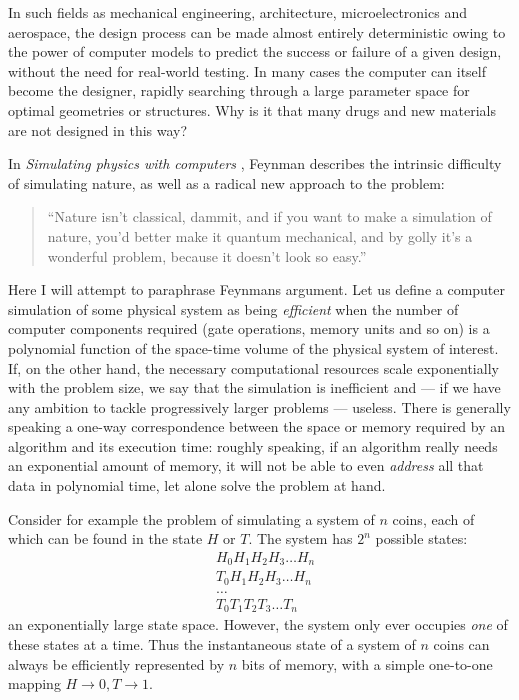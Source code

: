 In such fields as mechanical engineering, architecture, microelectronics and aerospace,  the design process can be made almost entirely deterministic owing to the power of computer models to predict the success or failure of a given design, without the need for real-world testing. In many cases the computer can itself become the designer, rapidly searching through a large parameter space for optimal geometries or structures.  Why is it that many drugs and new materials are not designed in this way?

In \emph{Simulating physics with computers} \cite{Feynman1982d}, Feynman describes the intrinsic difficulty of simulating nature, as well as a radical new approach to the problem:
\begin{quote}
``Nature isn't classical, dammit, and if you want to make a simulation of nature, you'd better make it quantum mechanical, and by golly it's a wonderful problem, because it doesn't look so easy.''
\end{quote}
Here I will attempt to paraphrase Feynmans argument. Let us define a computer simulation of some physical system as being \emph{efficient} when the number of computer components required (gate operations, memory units and so on) is a polynomial function of the space-time volume of the physical system of interest. If, on the other hand, the necessary computational resources scale exponentially with the problem size, we say that the simulation is inefficient and --- if we have any ambition to tackle progressively larger problems ---  useless. There is generally speaking a one-way correspondence between the space or memory required by an algorithm and its execution time: roughly speaking, if an algorithm really needs an exponential amount of memory, it will not be able to even \emph{address} all that data in polynomial time, let alone solve the problem at hand. 

Consider for example the problem of simulating a system of $n$ coins, each of which can be found in the state $H$ or $T$. The system has $2^n$ possible states:
\begin{eqnarray*}
   &H_0H_1H_2H_3\ldots H_n\\
   &T_0H_1H_2H_3\ldots H_n\\
   &\ldots\\
   &T_0T_1T_2T_3\ldots T_n
\end{eqnarray*} an exponentially large state space.
However, the system only ever occupies \emph{one} of these states at a time. Thus the instantaneous state of a system of $n$ coins can always be efficiently represented by $n$ bits of memory, with a simple one-to-one mapping $H \rightarrow 0, T \rightarrow 1$. 

